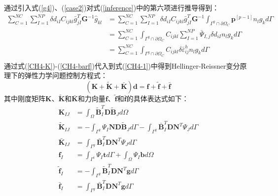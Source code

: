 通过引入式(\ref{g4})、(\ref{case2})对式(\ref{inference})中的第六项进行推导得到：
\begin{equation}\label{CH4-barf}
\begin{split}
    \sum_{C=1}^{N\!C}\sum_{I=1}^{N\!P}\delta d_{iI}C_{ijkl}\bar{g}^T_{jI}\pmb{G}^{-1}\hat{g}_{kl}
    &=\sum_{C=1}^{N\!C}\sum_{I=1}^{N\!P}\delta d_{iI}C_{ijkl}\bar{g}^T_{jI}\pmb{G}^{-1}\int_{\Gamma^g\cap\partial\Omega_C}\pmb{p}^{[p-1]}n_lg_kd\Gamma\\
    &=\sum_{C=1}^{N\!C}\int_{\Gamma^g\cap\partial\Omega_C}C_{ijkl}\sum_{I=1}^{N\!P}\bar{\Psi}_{I,j}\delta d_{iI}n_lg_kd\Gamma\\
    &=\sum_{C=1}^{N\!C}\int_{\Gamma^g\cap\partial\Omega_C}C_{ijkl}\delta\bar{\varepsilon}_{ij}^hn_lg_kd\Gamma\\
\end{split}
\end{equation}
通过式(\ref{CH4-K})-(\ref{CH4-barf})代入到式(\ref{CH4-1})中得到Hellinger-Reissner变分原理下的弹性力学问题控制方程式：
\begin{equation}\label{equationE}
    (\pmb{K}+\pmb{\tilde{K}}+\pmb{\bar{K}})\pmb{d}=\pmb{f}+\tilde{\pmb{f}}+\bar{\pmb{f}}
\end{equation}
其中刚度矩阵$\pmb K$、$\tilde{\pmb K}$和$\bar{\pmb K}$和力向量$\pmb f$、$\tilde{\pmb f}$和$\bar{\pmb f}$的具体表达式如下：
\begin{subequations}
\begin{align}
    \pmb{K}_{IJ}&=\int_{\Omega}\tilde{\pmb{B}}_I^T\pmb{D}\tilde{\pmb{B}}_Jd\Omega\\
    \tilde{\pmb{K}}_{IJ}&=-\int_{\Gamma^g}\Psi_I\pmb{N}\pmb{D}\tilde{\pmb B}_Jd\Gamma-\int_{\Gamma^g}\bar{\pmb B}_I^T\pmb{D}\pmb{N}^T\Psi_Jd\Gamma\\
    \bar{\pmb K}_{IJ}&=\int_{\Gamma^g}\bar{\pmb B}_I^T\pmb D\pmb N^T\Psi_Jd\Gamma\\
    \pmb{f}_I&=\int_{\Gamma^t}\Psi_I\pmb{t}d\Gamma+\int_{\Omega}\Psi_I\pmb{b}d\Omega\\
    \tilde{\pmb f}_I&=-\int_{\Gamma^g}\tilde{\pmb B}_I^T\pmb D\pmb N^T\pmb{g}d\Gamma\\
    \bar{\pmb f}_I&=\int_{\Gamma^g}\bar{\pmb B}_I^T\pmb D\pmb N^T \pmb{g}d\Gamma
\end{align}
\end{subequations}

